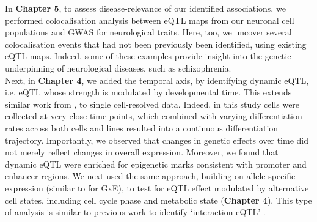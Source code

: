 In \textbf{Chapter 5}, to assess disease-relevance of our identified associations, we performed colocalisation analysis between eQTL maps from our neuronal cell populations and GWAS for neurological traits.
Here, too, we uncover several colocalisation events that had not been previously been identified, using existing eQTL maps.
Indeed, some of these examples provide insight into the genetic underpinning of neurological diseases, such as schizophrenia.\\

Next, in \textbf{Chapter 4}, we added the temporal axis, by identifying dynamic eQTL, i.e. eQTL whose strength is modulated by developmental time.
This extends similar work from \cite{francesconi2014effects, strober2019dynamic}, to single cell-resolved data.
Indeed, in this study cells were collected at very close time points, which combined with varying differentiation rates across both cells and lines resulted into a continuous differentiation trajectory.
Importantly, we observed that changes in genetic effects over time did not merely reflect changes in overall expression.
Moreover, we found that dynamic eQTL were enriched for epigenetic marks consistent with promoter and enhancer regions.
We next used the same approach, building on allele-specific expression (similar to \cite{knowles2017allele} for GxE), to test for eQTL effect modulated by alternative cell states, including cell cycle phase and metabolic state (\textbf{Chapter 4}).
This type of analysis is similar to previous work to identify `interaction eQTL' \cite{zhernakova2017identification, van2018single}. \\

